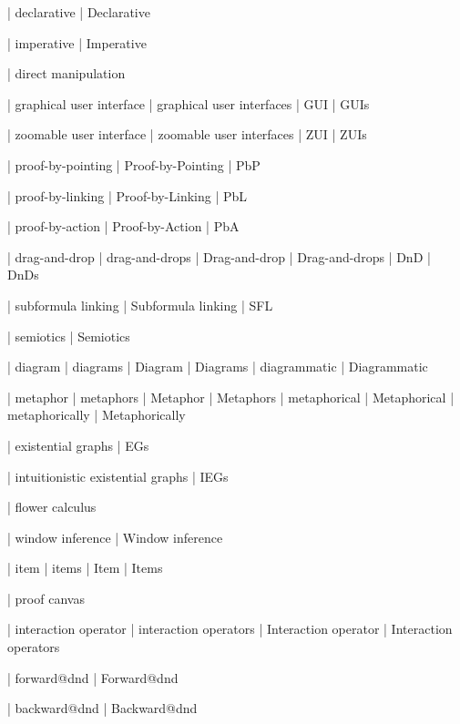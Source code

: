  | declarative
 | Declarative

 | imperative
 | Imperative

 | direct manipulation

 | graphical user interface
 | graphical user interfaces
 | GUI
 | GUIs

 | zoomable user interface
 | zoomable user interfaces
 | ZUI
 | ZUIs

 | proof-by-pointing
 | Proof-by-Pointing
 | PbP

 | proof-by-linking
 | Proof-by-Linking
 | PbL

 | proof-by-action
 | Proof-by-Action
 | PbA

 | drag-and-drop
 | drag-and-drops
 | Drag-and-drop
 | Drag-and-drops
 | DnD
 | DnDs

 | subformula linking
 | Subformula linking
 | SFL

 | semiotics
 | Semiotics

 | diagram
 | diagrams
 | Diagram
 | Diagrams
 | diagrammatic
 | Diagrammatic

 | metaphor
 | metaphors
 | Metaphor
 | Metaphors
 | metaphorical
 | Metaphorical
 | metaphorically
 | Metaphorically

 | existential graphs
 | EGs

 | intuitionistic existential graphs
 | IEGs

 | flower calculus
 
 | window inference
 | Window inference


 | item
 | items
 | Item
 | Items

 | proof canvas

 | interaction operator
 | interaction operators
 | Interaction operator
 | Interaction operators

 | forward@dnd
 | Forward@dnd

 | backward@dnd
 | Backward@dnd

